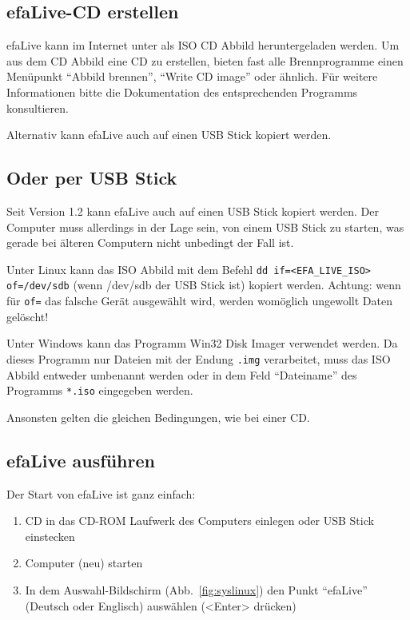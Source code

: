 \documentclass[a4paper,12pt,twoside]{article}
\begin{document}
\subsection{efaLive-CD erstellen}
\label{sct:cd_erstellen}
efaLive kann im Internet unter \cite{EFA4} als ISO CD Abbild
heruntergeladen werden. Um aus dem CD Abbild eine CD zu erstellen,
bieten fast alle Brennprogramme einen Menüpunkt "`Abbild brennen"', 
"`Write CD image"' oder ähnlich. Für weitere Informationen bitte 
die Dokumentation des entsprechenden Programms konsultieren. 

Alternativ kann efaLive auch auf einen USB Stick kopiert werden.


\subsection{Oder per USB Stick}
\label{sct:usb_stick}
Seit Version 1.2 kann efaLive auch auf einen USB Stick kopiert werden.
Der Computer muss allerdings in der Lage sein, von einem USB Stick zu
starten, was gerade bei älteren Computern nicht unbedingt der Fall ist.

Unter Linux kann das ISO Abbild mit dem Befehl \texttt{dd if={\textless}EFA\_LIVE\_ISO{\textgreater} 
of=/dev/sdb} (wenn /dev/sdb der USB Stick ist) kopiert werden. Achtung: 
wenn für \texttt{of=} das falsche Gerät ausgewählt wird, werden womöglich 
ungewollt Daten gelöscht!

Unter Windows kann das Programm Win32 Disk Imager \cite{IMG1} verwendet
werden. Da dieses Programm nur Dateien mit der Endung \texttt{.img} 
verarbeitet, muss das ISO Abbild entweder umbenannt werden oder in dem 
Feld "`Dateiname"' des Programms \texttt{*.iso} eingegeben werden.

Ansonsten gelten die gleichen Bedingungen, wie bei einer CD.


\subsection{efaLive ausführen}
\label{sct:live_ausfuehren}
Der Start von efaLive ist ganz einfach:

\begin{enumerate}
    \item CD in das CD-ROM Laufwerk des Computers einlegen oder USB Stick
        einstecken
    \item Computer (neu) starten
    \item In dem Auswahl-Bildschirm (Abb.~\ref{fig:syslinux}) den Punkt
        "`efaLive"' (Deutsch oder Englisch) auswählen ({\textless}Enter{\textgreater} 
        drücken)
\end{enumerate}
\end{document}
